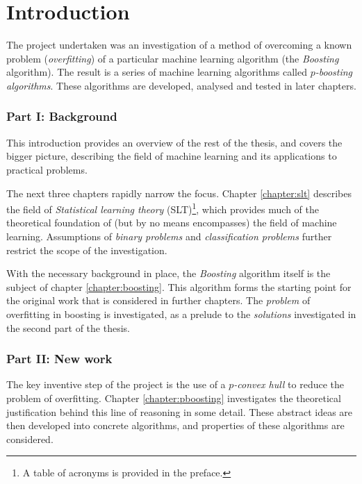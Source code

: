 
\chapter{Introduction}
\label{chapter:intro}

The project undertaken was an investigation of a method of
overcoming a known problem (\emph{overfitting}) of a particular
machine learning algorithm (the \emph{Boosting} algorithm).  The
result is a series of machine learning algorithms called
\emph{$p$-boosting algorithms}.  These algorithms are developed,
analysed and tested in later chapters.

\subsection*{Part I: Background}

This introduction provides an overview of the rest of the thesis, and
covers the bigger picture, describing the field of machine learning
and its applications to practical problems.

The next three chapters rapidly narrow the focus.  Chapter
\ref{chapter:slt} describes the field of \emph{Statistical learning
theory} (SLT)\footnote{A table of acronyms is provided in the
preface.}, which provides much of the theoretical
foundation of (but by no means encompasses) the field of machine
learning.  Assumptions of \emph{binary problems} and
\emph{classification problems} further restrict the scope of the
investigation.

With the necessary background in place, the \emph{Boosting} algorithm
itself is the subject of chapter \ref{chapter:boosting}.  This
algorithm forms the starting point for the original work that is
considered in further chapters.  The \emph{problem} of overfitting in
boosting is investigated, as a prelude to the \emph{solutions}
investigated in the second part of the thesis. 


\subsection*{Part II: New work}

The key inventive step of the project is the use of a \emph{$p$-convex
hull} to reduce the problem of overfitting.  Chapter
\ref{chapter:pboosting} investigates the theoretical justification
behind this line of reasoning in some detail.  These abstract ideas
are then developed into concrete algorithms, and properties of these
algorithms are considered.

